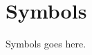 \chapter*{\centering Symbols}
\begin{spacing}{1.5}
\setlength{\parskip}{0.3in}

Symbols goes here.
\end{spacing}
\newpage

